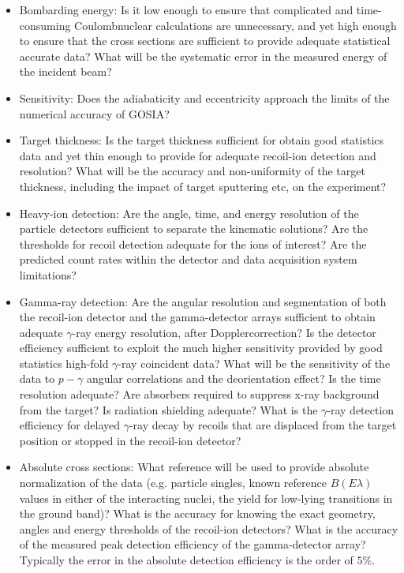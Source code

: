 \documentclass[10pt]{article}
\begin{document}
\begin{itemize}
  \item Bombarding energy: Is it low enough to ensure that complicated and time-consuming Coulombnuclear calculations are unnecessary, and yet high enough to ensure that the cross sections are sufficient to provide adequate statistical accurate data? What will be the systematic error in the measured energy of the incident beam?
  \item Sensitivity: Does the adiabaticity and eccentricity approach the limits of the numerical accuracy of GOSIA?
  \item Target thickness: Is the target thickness sufficient for obtain good statistics data and yet thin enough to provide for adequate recoil-ion detection and resolution? What will be the accuracy and non-uniformity of the target thickness, including the impact of target sputtering etc, on the experiment?
  \item Heavy-ion detection: Are the angle, time, and energy resolution of the particle detectors sufficient to separate the kinematic solutions? Are the thresholds for recoil detection adequate for the ions of interest? Are the predicted count rates within the detector and data acquisition system limitations?
  \item Gamma-ray detection: Are the angular resolution and segmentation of both the recoil-ion detector and the gamma-detector arrays sufficient to obtain adequate $\gamma$-ray energy resolution, after Dopplercorrection? Is the detector efficiency sufficient to exploit the much higher sensitivity provided by good statistics high-fold $\gamma$-ray coincident data? What will be the sensitivity of the data to $p-\gamma$ angular correlations and the deorientation effect? Is the time resolution adequate? Are absorbers required to suppress x-ray background from the target? Is radiation shielding adequate? What is the $\gamma$-ray detection efficiency for delayed $\gamma$-ray decay by recoils that are displaced from the target position or stopped in the recoil-ion detector?
  \item Absolute cross sections: What reference will be used to provide absolute normalization of the data (e.g. particle singles, known reference $B(E \lambda)$ values in either of the interacting nuclei, the yield for low-lying transitions in the ground band)? What is the accuracy for knowing the exact geometry, angles and energy thresholds of the recoil-ion detectors? What is the accuracy of the measured peak detection efficiency of the gamma-detector array? Typically the error in the absolute detection efficiency is the order of $5 \%$.

\end{itemize}
\end{document}

